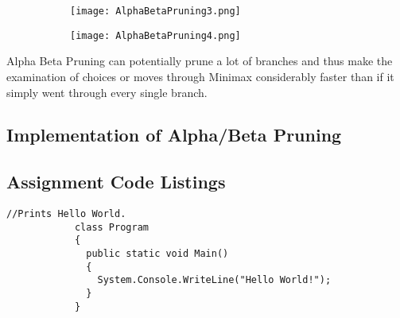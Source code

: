 \begin{figure}
    \caption{An example of branches being pruned} %
    \label{fig:AlphaBetaPruningB}
    \centering %
    \begin{subfigure}[b]{0.3\textwidth}
        \texttt{[image: AlphaBetaPruning3.png]}
    \end{subfigure}
    \begin{subfigure}[b]{0.3\textwidth}
        \texttt{[image: AlphaBetaPruning4.png]}
    \end{subfigure}
  \end{figure}

  Alpha Beta Pruning can potentially prune a lot of branches and 
  thus make the examination of choices or moves through Minimax considerably faster 
  than if it simply went through every single branch.

\subsection{Implementation of Alpha/Beta Pruning}
\label{subsec:Implementation of Alpha/Beta Pruning}
\subsection{Assignment Code Listings}
        \begin{lstlisting}[language={[Sharp]C}, caption={C\# example}, label={Script}]
            //Prints Hello World.
            class Program
            {
              public static void Main()
              {
                System.Console.WriteLine("Hello World!");
              }
            }
        \end{lstlisting}

\clearpage